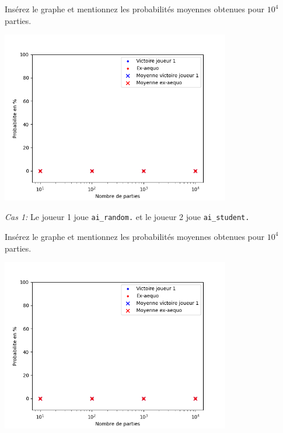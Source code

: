 \documentclass[11pt,answers]{exam}
\begin{document}
\begin{solutionbox}{100mm}
Insérez le graphe et mentionnez les probabilités moyennes obtenues pour $10^4$ parties.

\centering
\includegraphics[width=0.75\textwidth]{MCplot_empty.png}
\end{solutionbox}

\medskip

\emph{Cas 1:} Le joueur 1 joue \texttt{ai\_random.} et le joueur 2 joue \texttt{ai\_student.}

\begin{solutionbox}{100mm}
Insérez le graphe et mentionnez les probabilités moyennes obtenues pour $10^4$ parties.

\centering
\includegraphics[width=0.75\textwidth]{MCplot_empty.png}
\end{solutionbox}
\end{document}
